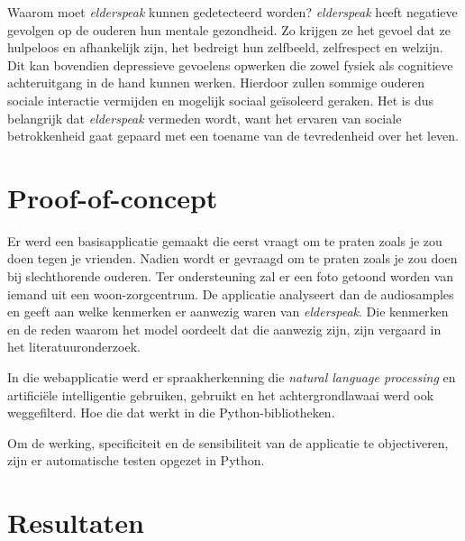 \documentclass[a0,portrait]{a0poster}
\begin{document}
\begin{multicols}{2}
Waarom moet \textit{elderspeak} kunnen gedetecteerd worden? \textit{elderspeak} heeft negatieve gevolgen op de ouderen hun mentale gezondheid. Zo krijgen ze het gevoel dat ze hulpeloos en afhankelijk zijn, het bedreigt hun zelfbeeld, zelfrespect en welzijn. Dit kan bovendien depressieve gevoelens opwerken die zowel fysiek als cognitieve achteruitgang in de hand kunnen werken. Hierdoor zullen sommige ouderen sociale interactie vermijden en mogelijk sociaal geïsoleerd geraken. Het is dus belangrijk dat \textit{elderspeak} vermeden wordt, want het ervaren van sociale betrokkenheid gaat gepaard met een toename van de tevredenheid over het leven.


\color{Black} %
\color{HoGentAccent1}
\section*{Proof-of-concept}
\color{black}

Er werd een basisapplicatie gemaakt die eerst vraagt om te praten zoals je zou doen tegen je vrienden. Nadien wordt er gevraagd om te praten zoals je zou doen bij slechthorende ouderen. Ter ondersteuning zal er een foto getoond worden van iemand uit een woon-zorgcentrum. De applicatie analyseert dan de audiosamples en geeft aan welke kenmerken er aanwezig waren van \textit{elderspeak}. Die kenmerken en de reden waarom het model oordeelt dat die aanwezig zijn, zijn vergaard in het literatuuronderzoek.

In die webapplicatie werd er spraakherkenning die \textit{natural language processing} en artificiële intelligentie gebruiken, gebruikt en het achtergrondlawaai werd ook weggefilterd. Hoe die dat werkt in die Python-bibliotheken.

Om de werking, specificiteit en de sensibiliteit van de applicatie te objectiveren, zijn er
automatische testen opgezet in Python.






\color{HoGentAccent1}
\section*{Resultaten}
\color{black}


\end{multicols}
\end{document}
